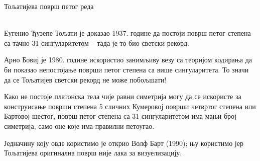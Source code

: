 \documentclass[sr]{./../../common/SurferDesc}%
\begin{document}
\footnotesize


\begin{surferPage}
  \begin{surferTitle}Тољатијева површ петог реда\end{surferTitle}  \\

    Еугенио Ђузепе Тољати је доказао 1937. године да постоји површ петог степена са тачно 
	31 сингуларитетом – тада је то био светски рекорд.


    Арно Бовиј је 1980. године искористио занимљиву везу са теоријом кодирања да би 
	показао непостојање површи петог степена са више сингуларитета. 
    То значи да се Тољатијев светски рекорд не може побољшати!

    Како не постоје платонска тела чије равни симетрија могу да се искористе за 
	конструисање површи степена 5 сличних Кумеровој површи четвртог степена или 
	Бартовој шестог, површ петог степена са 31 сингуларитетом има мањи број симетрија, 
	само оне које има правилни петоугао.


 Једначину коју овде користимо је открио Волф Барт (1990); њу користимо јер 
 Тољатијева оригинална површ није лака за визуелизацију.




  \begin{surferText}
     \end{surferText}
\end{surferPage}
\end{document}
